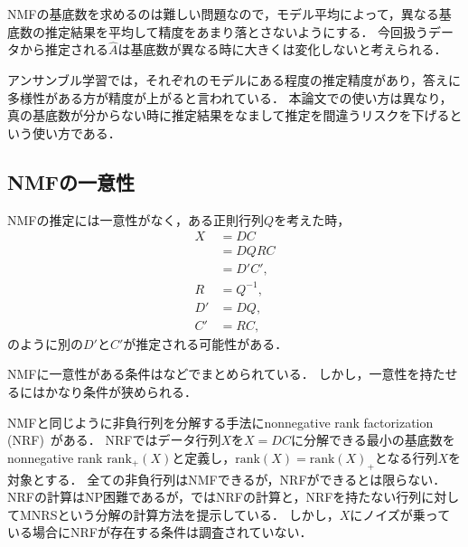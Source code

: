 NMFの基底数を求めるのは難しい問題なので，モデル平均によって，異なる基底数の推定結果を平均して精度をあまり落とさないようにする．
今回扱うデータから推定される$\hat{A}$は基底数が異なる時に大きくは変化しないと考えられる．

アンサンブル学習では，それぞれのモデルにある程度の推定精度があり\cite{Kittler1998}，答えに多様性がある方が精度が上がる\cite{Kuncheva2006}と言われている．
本論文での使い方は異なり，真の基底数が分からない時に推定結果をなまして推定を間違うリスクを下げるという使い方である．

\subsection{NMFの一意性}
NMFの推定には一意性がなく，ある正則行列$Q$を考えた時，
\begin{align}
	X &= DC \\
	&= D Q R C \label{eq:dqrc} \\
	&= D'C', \\
	R &= Q^{-1}, \\
	D' &= DQ, \\
	C' &= RC,
\end{align}
のように別の$D'$と$C'$が推定される可能性がある．

NMFに一意性がある条件は\cite{Fu}などでまとめられている．
しかし，一意性を持たせるにはかなり条件が狭められる．

NMFと同じように非負行列を分解する手法にnonnegative rank factorization (NRF)~\cite{Dong2014}がある．
NRFではデータ行列$X$を$X = DC$に分解できる最小の基底数をnonnegative rank $\text{rank}_+(X)$と定義し，$\text{rank}(X) = \text{rank}(X)_+$となる行列$X$を対象とする．
全ての非負行列はNMFできるが，NRFができるとは限らない．
NRFの計算はNP困難であるが，\cite{Dong2014}ではNRFの計算と，NRFを持たない行列に対してMNRSという分解の計算方法を提示している．
しかし，$X$にノイズが乗っている場合にNRFが存在する条件は調査されていない．

